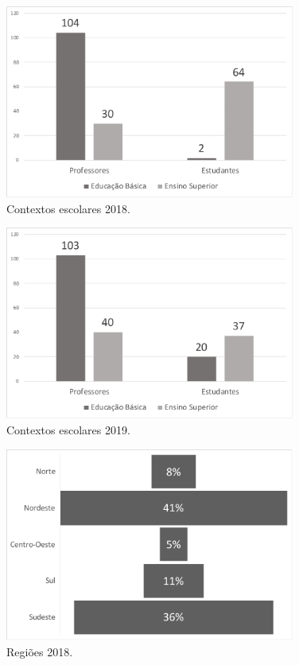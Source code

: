 \documentclass[portuguese]{textolivre}
\begin{document}
\begin{figure}[htbp]
 \centering
 \includegraphics[width=0.85\textwidth]{Figura3.pdf}
 \caption{Contextos escolares 2018.}
 \label{Fig3}
\end{figure}

\begin{figure}[htbp]
 \centering
 \includegraphics[width=0.85\textwidth]{Figura4.pdf}
 \caption{Contextos escolares 2019.}
 \label{Fig4}
\end{figure}

\begin{figure}[htbp]
 \centering
 \includegraphics[width=0.85\textwidth]{Figura5.pdf}
 \caption{Regiões 2018.}
 \label{Fig5}
\end{figure}
\end{document}
